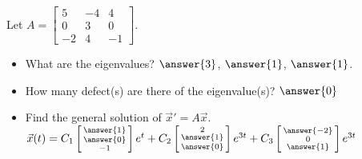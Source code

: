 \documentclass{ximera}
\begin{document}
\begin{exercise}
    Let $A = 
    \left[ 
        \begin{smallmatrix}
            5 & -4 & 4 \\
            0 & 3 & 0 \\
            -2 & 4 & -1
        \end{smallmatrix} 
    \right]$.
    \begin{itemize}
        \item What are the eigenvalues? $\answer{3}$, $\answer{1}$, $\answer{1}$.
        \item How many defect(s) are there of the eigenvalue(s)? $\answer{0}$
        \item Find the general solution of ${\vec{x}}' = A \vec{x}$.\\
            $\vec{x}(t) = C_1\left[\begin{smallmatrix} \answer{1} \\ \answer{0} \\ -1 \end{smallmatrix}\right]e^t + C_2\left[\begin{smallmatrix} 2 \\ \answer{1} \\ \answer{0} \end{smallmatrix}\right]e^{3t} + C_3\left[\begin{smallmatrix} \answer{-2} \\ 0 \\ \answer{1} \end{smallmatrix}\right]e^{3t}$
    \end{itemize}
\end{exercise}
\end{document}
